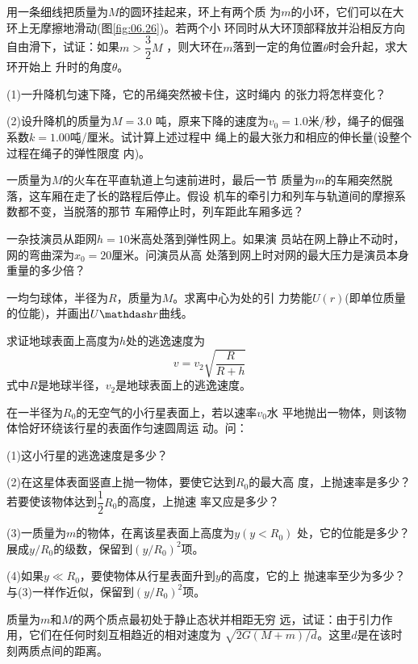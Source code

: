 \begin{exercises}
\exercise 用一条细线把质量为$ M $的圆环挂起来，环上有两个质
为$ m $的小环，它们可以在大环上无摩擦地滑动(图\ref{fig:06.26})。若两个小
环同时从大环顶部释放并沿相反方向自由滑下，试证：如果$ m >
\dfrac { 3 } { 2 } M $
，则大环在$ m $落到一定的角位置$ \theta $时会升起，求大环开始上
升时的角度$ \theta $。

\exercise (1)一升降机匀速下降，它的吊绳突然被卡住，这时绳内
的张力将怎样变化？

(2)设升降机的质量为$ M = 3.0 $ 吨，原来下降的速度为$ v _ { 0 } =
1.0 $米/秒，绳子的倔强系数$ k = 1.00 $吨/厘米。试计算上述过程中
绳上的最大张力和相应的伸长量(设整个过程在绳子的弹性限度
内)。

\exercise 一质量为$ M $的火车在平直轨道上匀速前进时，最后一节
质量为$ m $的车厢突然脱落，这车厢在走了长的路程后停止。假设
机车的牵引力和列车与轨道间的摩擦系数都不变，当脱落的那节
车厢停止时，列车距此车厢多远？

\exercise 一杂技演员从距网$ h = 1 0 $米高处落到弹性网上。如果演
员站在网上静止不动时，网的弯曲深为$ x _ { 0 } = 2 0 $厘米。问演员从高
处落到网上时对网的最大压力是演员本身重量的多少倍？

\exercise 一均匀球体，半径为$ R $，质量为$ M $。求离中心为处的引
力势能$ U(r) $(即单位质量的位能)，并画出$ U \mathdash r $曲线。

\exercise 求证地球表面上高度为$ h $处的逃逸速度为
\begin{equation*}
 v = v _ { 2 } \sqrt { \frac { R } { R + h } }
\end{equation*}
式中$ R $是地球半径，$ v _ { 2 } $是地球表面上的逃逸速度。

\exercise 在一半径为$ R_0 $的无空气的小行星表面上，若以速率$ v_0 $水
平地抛出一物体，则该物体恰好环绕该行星的表面作匀速圆周运
动。问：

(1)这小行星的逃逸速度是多少？

(2)在这星体表面竖直上抛一物体，要使它达到$ R_0 $的最大高
度，上抛速率是多少？若要使该物体达到$
\dfrac { 1 } { 2 } R_0 $的高度，上抛速
率又应是多少？

(3)一质量为$ m $的物体，在离该星表面上高度为$ y ( y < R _ { 0 } ) $
处，它的位能是多少？\lhbrak 展成$ y / R _ { 0 } $的级数，保留到$ ( y / R _ { 0 } ) ^ { 2 } $项。\rhbrak

(4)如果$ y \ll R _ { 0 } $，要使物体从行星表面升到$ y $的高度，它的上
抛速率至少为多少？\lhbrak 与(3)一样作近似，保留到$ ( y / R _ { 0 } ) ^ { 2 } $项。\rhbrak

\exercise 质量为$ m $和$ M $的两个质点最初处于静止态状并相距无穷
远，试证：由于引力作用，它们在任何时刻互相趋近的相对速度为
$ \sqrt { 2 G ( M + m ) / d } $。这里$ d $是在该时刻两质点间的距离。


\end{exercises}
